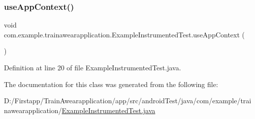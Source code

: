 \subsubsection{\texorpdfstring{useAppContext()}{useAppContext()}}
{\footnotesize\ttfamily void com.\+example.\+trainawearapplication.\+Example\+Instrumented\+Test.\+use\+App\+Context (\begin{DoxyParamCaption}{ }\end{DoxyParamCaption})\hspace{0.3cm}{\ttfamily [inline]}}



Definition at line 20 of file Example\+Instrumented\+Test.\+java.


\begin{DoxyCode}{0}

\end{DoxyCode}


The documentation for this class was generated from the following file\+:\begin{DoxyCompactItemize}
\item 
D\+:/\+Firstapp/\+Train\+Awearapplication/app/src/android\+Test/java/com/example/trainawearapplication/\mbox{\hyperlink{_example_instrumented_test_8java}{Example\+Instrumented\+Test.\+java}}\end{DoxyCompactItemize}
